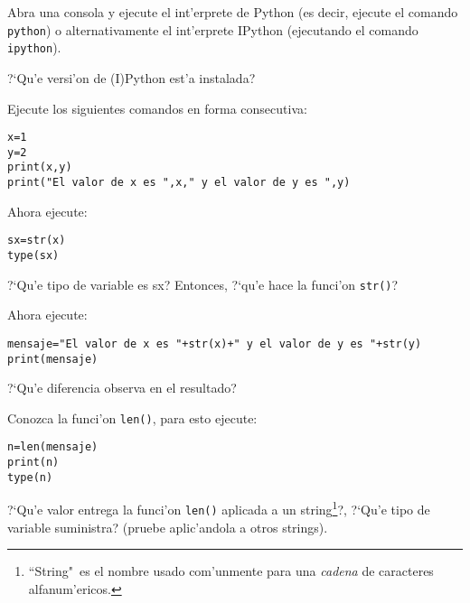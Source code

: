 \documentclass[11pt]{exam}
\begin{document}
\firstpageheadrule
\runningheadrule
{}
\cfoot{ }
\begin{flushleft}
\vspace{0.2in}
\vspace{0.25cm}
\end{flushleft}

\begin{questions}

\item Abra una consola y ejecute el int'erprete de Python (es decir, ejecute el comando \texttt{python}) o alternativamente el int'erprete IPython (ejecutando el comando \texttt{ipython}). 
\begin{parts}
\item ?`Qu'e versi'on de (I)Python est'a instalada?
\item Ejecute los siguientes comandos en forma consecutiva:
\begin{verbatim}
x=1
y=2
print(x,y)
print("El valor de x es ",x," y el valor de y es ",y)
\end{verbatim}
\item Ahora ejecute:
\begin{verbatim}
sx=str(x)
type(sx)
\end{verbatim}
?`Qu'e tipo de variable es sx? Entonces, ?`qu'e hace la funci'on \texttt{str()}?
\item Ahora ejecute:
\begin{verbatim}
mensaje="El valor de x es "+str(x)+" y el valor de y es "+str(y)
print(mensaje)
\end{verbatim}
?`Qu'e diferencia observa en el resultado?
\item Conozca la funci'on \texttt{len()}, para esto ejecute:
\begin{verbatim}
n=len(mensaje)
print(n)
type(n)
\end{verbatim}
?`Qu'e valor entrega la funci'on \texttt{len()} aplicada a un string\footnote{``String"\, es el nombre usado com'unmente para una \textit{cadena} de caracteres alfanum'ericos.}?, ?`Qu'e tipo de variable suministra? (pruebe aplic'andola a otros strings).


\end{parts}
\end{questions}
\end{document}
